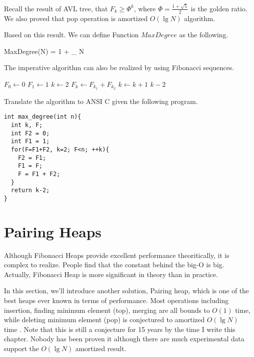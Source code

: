\documentclass{article}
\begin{document}
Recall the result of AVL tree, that $F_k \geq \Phi^k$, where
$\Phi = \frac{1+\sqrt{5}}{2}$ is the golden ratio. We also proved
that pop operation is amortized $O(\lg N)$ algorithm.

Based on this result. We can define Function $MaxDegree$ as the following.

\be
  MaxDegree(N) = 1 + \lfloor \log_{\Phi} N \rfloor
\ee

The imperative  algorithm can also be realized by 
using Fibonacci sequences.

\begin{algorithmic}
  \State $F_0 \gets 0$
  \State $F_1 \gets 1$
  \State $k \gets 2$
  \Repeat
    \State $F_k \gets F_{k_1} + F_{k_2}$
    \State $k \gets k+1$
  \State \Return $k-2$
\EndFunction
\end{algorithmic}

Translate the algorithm to ANSI C given the following program.

\lstset{language=C}
\begin{lstlisting}
int max_degree(int n){
  int k, F;
  int F2 = 0; 
  int F1 = 1;
  for(F=F1+F2, k=2; F<n; ++k){
    F2 = F1;
    F1 = F;
    F = F1 + F2;
  }
  return k-2;
}
\end{lstlisting}


\section{Pairing Heaps}
\label{pairing-heap}
Although Fibonacci Heaps provide excellent performance theoritically,
it is complex to realize. People find that the constant behind the
big-O is big. Actually, Fibonacci Heap is more significant in theory
than in practice.

In this section, we'll introduce another solution, Pairing heap,
which is one of the best heaps ever known in terms of performance. 
Most operations including insertion, finding minimum element (top), 
merging are all bounds to $O(1)$ time, while deleting minimum element (pop)
is conjectured to amortized $O(\lg N)$ time \cite{pairing-heap} 
\cite{okasaki-book}. Note that this is still
a conjecture for 15 years by the time I write this chapter. Nobody has been 
proven it although there are much experimental data support the
$O(\lg N)$ amortized result.
\end{document}
